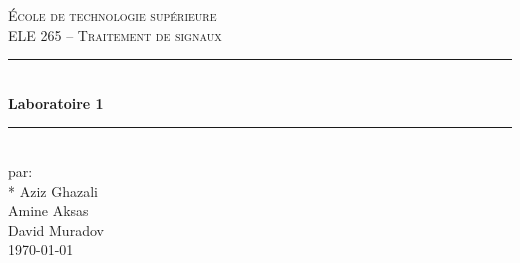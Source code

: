 \documentclass[11pt, letterpaper]{article}
\begin{document}
\begin{titlepage}
\center

\vspace*{2cm}

\textsc{\LARGE École de technologie supérieure}\\[1cm]
\textsc{\Large ELE 265 -- Traitement de signaux}\\[1.5cm]

\rule{\linewidth}{0.5mm} \\[0.5cm]
{\LARGE \bfseries Laboratoire 1} \\[0.2cm]
\rule{\linewidth}{0.5mm} \\[3cm]

\large par: \\*
Aziz Ghazali\\
Amine Aksas\\
David Muradov\\[8cm]


{\large \today }\\[3cm]

\vfill
\end{titlepage}



%
%
%
%
%
\end{document}
